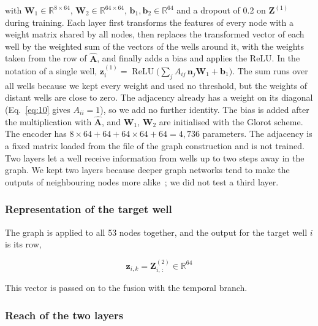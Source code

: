 \documentclass[conference]{IEEEtran}
\begin{document}
with \(\mathbf{W}_1 \in \mathbb{R}^{8 \times 64}\), \(\mathbf{W}_2 \in \mathbb{R}^{64 \times 64}\), \(\mathbf{b}_1, \mathbf{b}_2 \in \mathbb{R}^{64}\) and a dropout of 0.2 on \(\mathbf{Z}^{(1)}\) during training. Each layer first transforms the features of every node with a weight matrix shared by all nodes, then replaces the transformed vector of each well by the weighted sum of the vectors of the wells around it, with the weights taken from the row of \(\hat{\mathbf{A}}\), and finally adds a bias and applies the ReLU. In the notation of a single well, \(\mathbf{z}^{(1)}_i = \operatorname{ReLU}\big(\sum_{j} \hat{A}_{ij}\,\mathbf{n}_j \mathbf{W}_1 + \mathbf{b}_1\big)\). The sum runs over all wells because we kept every weight and used no threshold, but the weights of distant wells are close to zero. The adjacency already has a weight on its diagonal (Eq.~\ref{eq:10} gives \(A_{ii} = 1\)), so we add no further identity. The bias is added after the multiplication with \(\hat{\mathbf{A}}\), and \(\mathbf{W}_1\), \(\mathbf{W}_2\) are initialised with the Glorot scheme. The encoder has \(8 \times 64 + 64 + 64 \times 64 + 64 = 4{,}736\) parameters. The adjacency is a fixed matrix loaded from the file of the graph construction and is not trained. Two layers let a well receive information from wells up to two steps away in the graph. We kept two layers because deeper graph networks tend to make the outputs of neighbouring nodes more alike~\cite{ref21}; we did not test a third layer.

\subsubsection{Representation of the target well}

The graph is applied to all 53 nodes together, and the output for the target well \(i\) is its row,

\begin{equation}
\mathbf{z}_{i,k} = \mathbf{Z}^{(2)}_{i,\,:} \in \mathbb{R}^{64}\label{eq:18}
\end{equation}

This vector is passed on to the fusion with the temporal branch.

\subsubsection{Reach of the two layers}
\end{document}
